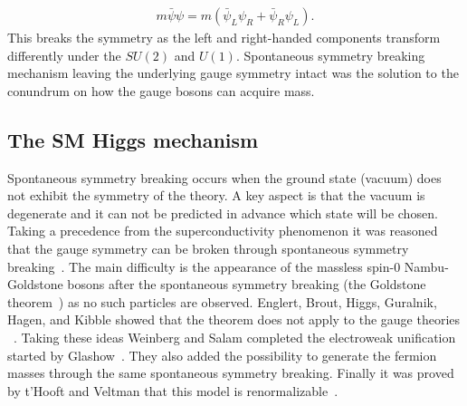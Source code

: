 \begin{eqnarray} \label{eq:fermion}
m\bar{\psi}\psi = m(\bar{\psi}_L\psi_R+\bar{\psi}_R\psi_L).
\end{eqnarray}
This breaks the symmetry as the left and right-handed components transform differently under the $SU(2)$ and $U(1)$. Spontaneous symmetry breaking mechanism leaving the underlying gauge symmetry intact was the solution to the conundrum on how the gauge bosons can acquire mass. 

\subsection{The SM Higgs mechanism}

Spontaneous symmetry breaking occurs when the ground state (vacuum) does not exhibit the symmetry of the theory. A key aspect is that the vacuum is degenerate and it can not be predicted in advance which state will be chosen. Taking a precedence from the superconductivity phenomenon it was reasoned that the gauge symmetry can be broken through spontaneous symmetry breaking~\cite{Nambu:1960tm,Anderson:1963pc}. The main difficulty is the appearance of the massless spin-$0$ Nambu-Goldstone bosons after the spontaneous symmetry breaking (the Goldstone theorem~\cite{Goldstone:1962es}) as no such particles are observed. Englert, Brout, Higgs, Guralnik, Hagen, and Kibble showed that the theorem does not apply to the gauge theories ~\cite{Englert:1964et,Higgs:1964ia,Higgs:1964pj,Guralnik:1964eu,Higgs:1966ev,Kibble:1967sv}.  Taking these ideas Weinberg and Salam completed the electroweak unification started by Glashow~\cite{Glashow:1961tr,Weinberg:1967tq,Salam:1968rm}. They also added the possibility to generate the fermion masses through the same spontaneous symmetry breaking. Finally it was proved by t'Hooft and Veltman that this model is renormalizable~\cite{tHooft:1972fi}. 

